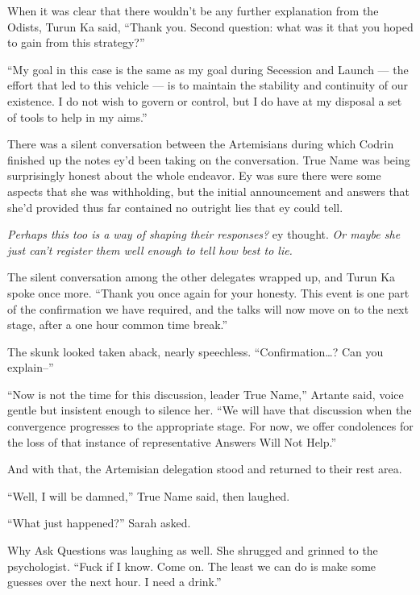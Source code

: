 When it was clear that there wouldn't be any further explanation from the Odists, Turun Ka said, ``Thank you. Second question: what was it that you hoped to gain from this strategy?''

``My goal in this case is the same as my goal during Secession and Launch — the effort that led to this vehicle — is to maintain the stability and continuity of our existence. I do not wish to govern or control, but I do have at my disposal a set of tools to help in my aims.''

There was a silent conversation between the Artemisians during which Codrin finished up the notes ey'd been taking on the conversation. True Name was being surprisingly honest about the whole endeavor. Ey was sure there were some aspects that she was withholding, but the initial announcement and answers that she'd provided thus far contained no outright lies that ey could tell.

\emph{Perhaps this too is a way of shaping their responses?} ey thought. \emph{Or maybe she just can't register them well enough to tell how best to lie.}

The silent conversation among the other delegates wrapped up, and Turun Ka spoke once more. ``Thank you once again for your honesty. This event is one part of the confirmation we have required, and the talks will now move on to the next stage, after a one hour common time break.''

The skunk looked taken aback, nearly speechless. ``Confirmation\ldots? Can you explain--''

``Now is not the time for this discussion, leader True Name,'' Artante said, voice gentle but insistent enough to silence her. ``We will have that discussion when the convergence progresses to the appropriate stage. For now, we offer condolences for the loss of that instance of representative Answers Will Not Help.''

And with that, the Artemisian delegation stood and returned to their rest area.

``Well, I will be damned,'' True Name said, then laughed.

``What just happened?'' Sarah asked.

Why Ask Questions was laughing as well. She shrugged and grinned to the psychologist. ``Fuck if I know. Come on. The least we can do is make some guesses over the next hour. I need a drink.''
